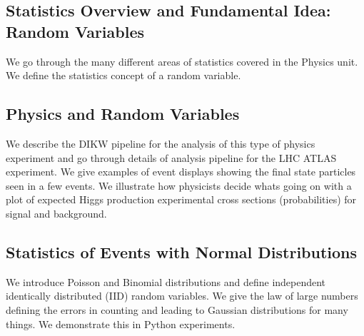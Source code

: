 

\subsection{Statistics Overview and Fundamental Idea: Random
Variables}\label{statistics-overview-and-fundamental-idea-random-variables}

We go through the many different areas of statistics covered in the
Physics unit. We define the statistics concept of a random variable.


\subsection{Physics and Random
Variables}\label{physics-and-random-variables}

We describe the DIKW pipeline for the analysis of this type of physics
experiment and go through details of analysis pipeline for the LHC ATLAS
experiment. We give examples of event displays showing the final state
particles seen in a few events. We illustrate how physicists decide
whats going on with a plot of expected Higgs production experimental
cross sections (probabilities) for signal and background.



\subsection{Statistics of Events with Normal
Distributions}\label{statistics-of-events-with-normal-distributions}

We introduce Poisson and Binomial distributions and define independent
identically distributed (IID) random variables. We give the law of large
numbers defining the errors in counting and leading to Gaussian
distributions for many things. We demonstrate this in Python
experiments.


